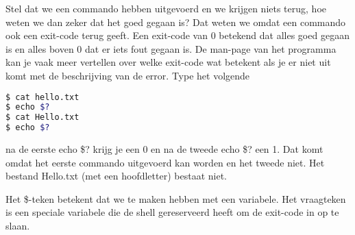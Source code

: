 Stel dat we een commando hebben uitgevoerd en we krijgen niets terug, hoe weten we dan zeker dat het goed gegaan is? Dat weten we omdat een commando ook een exit{}-code terug geeft. Een exit{}-code van 0 betekend dat alles goed gegaan is en alles boven 0 dat er iets fout gegaan is. De man-page van het programma kan je vaak meer vertellen over welke exit{}-code wat betekent als je er niet uit komt met de beschrijving van de error. Type het volgende
\begin{lstlisting}[language=bash]
$ cat hello.txt
$ echo $?
$ cat Hello.txt
$ echo $?
\end{lstlisting}
na de eerste echo \$? krijg je een 0 en na de tweede echo \$? een 1. Dat komt omdat het eerste commando uitgevoerd kan worden en het tweede niet. Het bestand Hello.txt (met een hoofdletter) bestaat niet.

Het \$-teken betekent dat we te maken hebben met een variabele. Het vraagteken is een speciale variabele die de shell gereserveerd heeft om de exit-code in op te slaan.
